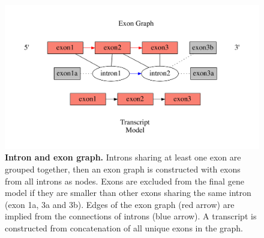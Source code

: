 \documentclass[10pt]{article}
\begin{document}
\begin{figure}[!ht]
\begin{center}
\includegraphics[width=5in]{algorithm.pdf}
\end{center}
\caption{
{\bf Intron and exon graph.}
Introns sharing at least one exon are grouped together, then an
exon graph is constructed with exons from all introns as nodes.
Exons are excluded from the final gene model if they are smaller
than other exons sharing the same intron (exon 1a, 3a and 3b).
Edges of the exon graph (red arrow) are implied from the
connections of introns (blue arrow).  A transcript is constructed
from concatenation of all unique exons in the graph.
}
\label{algorithm}
\end{figure}
\end{document}
